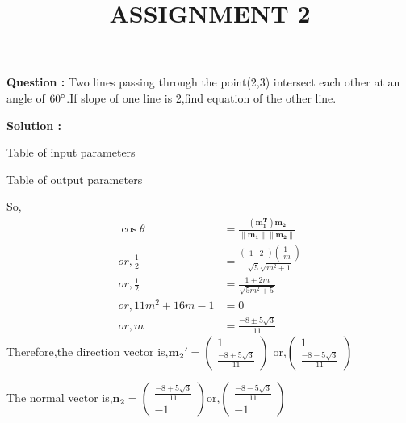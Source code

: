\documentclass[12pt]{article}
\let\vec\mathbf
\providecommand{\norm}[1]{\ensuremath{\lVert#1\rVert}}
\begin{document}
\title{\textbf{ASSIGNMENT 2}}
\date{}
\maketitle
\textbf{Question :} Two lines passing through the point(2,3) intersect each other at an angle of $60\degree$.If slope of one line is 2,find equation of the other line.

\textbf{Solution :}

\begin{table}[H]
    \centering
    
    \caption{Table of input parameters}
    \label{tab:1}
\end{table}



\begin{table}[H]
    \centering
    
    \caption{Table of output parameters}
    \label{tab:2}
\end{table}

So,
\begin{align}
  \cos{\theta}&=\frac{\vec{(m_1^T)m_2}}{\vec{\norm{m_1}\norm{m_2}}}\\
    or,\frac{1}{2}&=\frac{\begin{pmatrix}
        1&2
    \end{pmatrix}\begin{pmatrix}
        1\\m
    \end{pmatrix}}{\sqrt{5}\sqrt{m^2+1}}\\
   or, \frac{1}{2}&=\frac{1+2m}{\sqrt{5m^2+5}}\\
   or,11m^2+16m-1&=0\\
   or, m&=\frac{-8\pm5\sqrt{3}}{11}    
\end{align}
Therefore,the direction vector is,$\vec{m_2'}=\begin{pmatrix}
    1\\\frac{-8+5\sqrt{3}}{11}
\end{pmatrix}$ or,$\begin{pmatrix}
    1\\\frac{-8-5\sqrt{3}}{11}\end{pmatrix}$

The normal vector is,$\vec{n_2}=\begin{pmatrix}
    \frac{-8+5\sqrt{3}}{11}\\-1
\end{pmatrix}$or,$\begin{pmatrix}
    \frac{-8-5\sqrt{3}}{11}\\-1
\end{pmatrix}$
\end{document}
